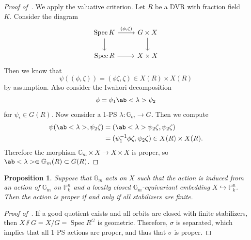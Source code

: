 \documentclass{amsart}
\newtheorem{prop}[thm]{Proposition}
\theoremstyle{definition}
\theoremstyle{remark}
\theoremstyle{plain}
\theoremstyle{definition}
\theoremstyle{remark}
\newcommand{\G}{\mathbb{G}}
\renewcommand{\P}{\mathbb{P}}
\newcommand{\1}{\mathbf{1}}
\newcommand{\2}{\mathbf{2}}
\newcommand{\3}{\mathbf{3}}
\DeclareMathOperator{\Spec}{Spec}
\begin{document}
\begin{proof}[Proof of~]
    We apply the valuative criterion. Let \(R\) be a DVR with fraction field \(K\). Consider the diagram
    \begin{equation*}
    \begin{tikzcd}
        \Spec K \ar{r}{(\phi, \zeta)} \ar{d} & G \times X \ar{d} \\
        \Spec R \ar{r} & X \times X
    \end{tikzcd}
    \end{equation*}
    Then we know that 
    \[ \psi((\phi, \zeta)) = (\phi \zeta, \zeta) \in X(R) \times X(R) \]
    by assumption. Also consider the Iwahori decomposition
    \[ \phi = \psi_1 \ab<\lambda> \psi_2 \]
    for \(\psi_i \in G(R)\). Now consider a 1-PS \(\lambda \colon \G_m \to G\). Then we compute
    \begin{align*}
        \psi(\ab<\lambda>, \psi_2 \zeta) &= (\ab<\lambda> \psi_2 \zeta, \psi_2 \zeta) \\
        &= (\psi_1^{-1} \phi \zeta, \psi_2 \zeta) \in X(R) \times X(R).
    \end{align*}
    Therefore the morphism \(\G_m \times X \to X \times X\) is proper, so \(\ab<\lambda> \in \G_m(R) \subset G(R)\). 
\end{proof}

\begin{prop}\label{prop:1-ps-proper-criterion}
    Suppose that \(\G_m\) acts on \(X\) such that the action is induced from an action of \(\G_m\) on \(\P^n_k\) and a locally closed \(\G_m\)-equivariant embedding \(X \hookrightarrow \P^n_k\). Then the action is proper if and only if all stabilizers are finite.
\end{prop}

\begin{proof}[Proof of~]
   If a good quotient exists and all orbits are closed with finite stabilizers, then \(X \sslash G = X/G = \Spec R^G\) is geometric. Therefore, \(\sigma\) is separated, which implies that all 1-PS actions are proper, and thus that \(\sigma\) is proper.
\end{proof}
\end{document}
